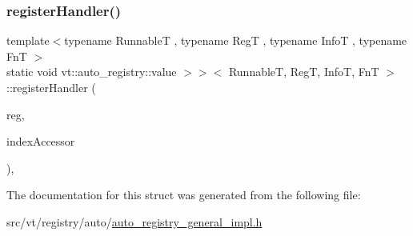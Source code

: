 \subsubsection{\texorpdfstring{register\+Handler()}{registerHandler()}}
{\footnotesize\ttfamily template$<$typename RunnableT , typename RegT , typename InfoT , typename FnT $>$ \\
static void vt\+::auto\+\_\+registry\+::value $>$$>$$<$ RunnableT, RegT, InfoT, FnT $>$\+::register\+Handler (\begin{DoxyParamCaption}\item[{RegT \&}]{reg,  }\item[{\hyperlink{structvt_1_1auto__registry_1_1_registrar_gen_info}{Registrar\+Gen\+Info}}]{index\+Accessor }\end{DoxyParamCaption})\hspace{0.3cm}{\ttfamily [inline]}, {\ttfamily [static]}}



The documentation for this struct was generated from the following file\+:\begin{DoxyCompactItemize}
\item 
src/vt/registry/auto/\hyperlink{auto__registry__general__impl_8h}{auto\+\_\+registry\+\_\+general\+\_\+impl.\+h}\end{DoxyCompactItemize}
